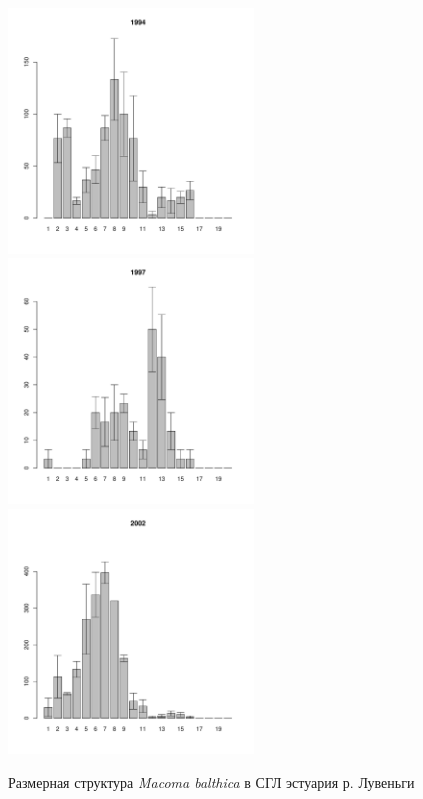 \documentclass[12pt, a4paper]{article}
\begin{document}
\begin{figure}[h]
\begin{multicols}{3}
\hfill
\includegraphics[width=65mm]{../White_Sea/Estuatiy_Luvenga/sizestr_1994_.pdf}
\hfill
\includegraphics[width=65mm]{../White_Sea/Estuatiy_Luvenga/sizestr_1997_.pdf}
\hfill
\includegraphics[width=65mm]{../White_Sea/Estuatiy_Luvenga/sizestr_2002_.pdf}
\end{multicols}




\caption{Размерная структура {\it Macoma balthica} в СГЛ эстуария р. Лувеньги}
\label{ris:size_str_estuary_Luv}
\end{figure}
\end{document}

